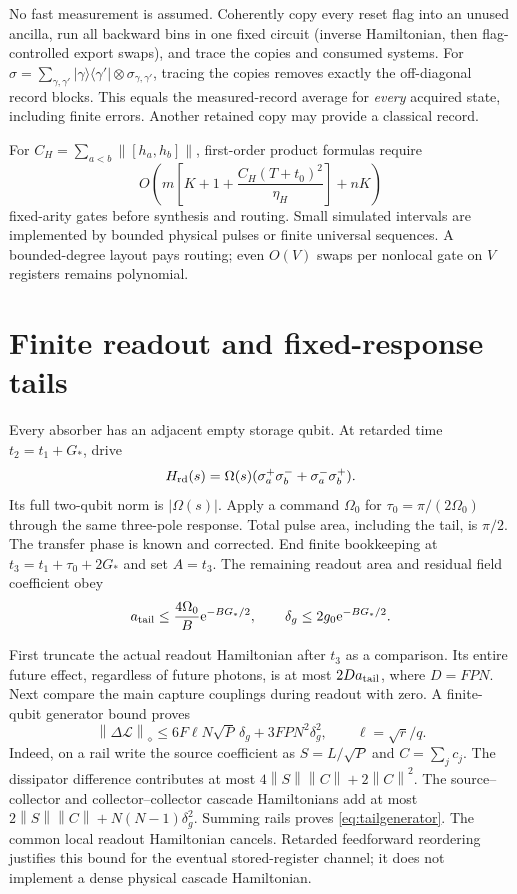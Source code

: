 \documentclass[11pt,a4paper]{article}
\newcommand{\norm}[1]{\left\lVert #1\right\rVert}\newcommand{\ket}[1]{\lvert #1\rangle}\newcommand{\bra}[1]{\langle #1\rvert}
\newcommand{\ee}{\mathrm e}
\begin{document}
No fast measurement is assumed. Coherently copy every reset flag into an unused ancilla, run all backward bins in one fixed circuit (inverse Hamiltonian, then flag-controlled export swaps), and trace the copies and consumed systems. For $\sigma=\sum_{\gamma,\gamma'}\ket\gamma\bra{\gamma'}\otimes\sigma_{\gamma,\gamma'}$, tracing the copies removes exactly the off-diagonal record blocks. This equals the measured-record average for \emph{every} acquired state, including finite errors. Another retained copy may provide a classical record.

For $C_H=\sum_{a<b}\norm{[h_a,h_b]}$, first-order product formulas require
\begin{equation}
 O\left(m\left[K+1+\frac{C_H(T+t_0)^2}{\eta_H}\right]+nK\right)
 \label{eq:decodercost}
\end{equation}
fixed-arity gates before synthesis and routing. Small simulated intervals are implemented by bounded physical pulses or finite universal sequences. A bounded-degree layout pays routing; even $O(V)$ swaps per nonlocal gate on $V$ registers remains polynomial.

\section{Finite readout and fixed-response tails}

Every absorber has an adjacent empty storage qubit. At retarded time $t_2=t_1+G_*$, drive
\begin{equation}
 H_{\rm rd}(s)=\Omega(s)(\sigma_a^+\sigma_b^-+\sigma_a^-\sigma_b^+).
\end{equation}
Its full two-qubit norm is $|\Omega(s)|$. Apply a command $\Omega_0$ for $\tau_0=\pi/(2\Omega_0)$ through the same three-pole response. Total pulse area, including the tail, is $\pi/2$. The transfer phase is known and corrected. End finite bookkeeping at $t_3=t_1+\tau_0+2G_*$ and set $A=t_3$. The remaining readout area and residual field coefficient obey
\begin{equation}
 a_{\rm tail}\le\frac{4\Omega_0}{B}\ee^{-BG_*/2},\qquad
 \delta_g\le2g_0\ee^{-BG_*/2}.
\end{equation}

First truncate the actual readout Hamiltonian after $t_3$ as a comparison. Its entire future effect, regardless of future photons, is at most $2D a_{\rm tail}$, where $D=FPN$. Next compare the main capture couplings during readout with zero. A finite-qubit generator bound proves
\begin{equation}
 \norm{\Delta\mathcal L}_\diamond
 \le6F\ell N\sqrt P\,\delta_g+3FPN^2\delta_g^2,
 \qquad\ell=\sqrt r/q.
 \label{eq:tailgenerator}
\end{equation}
Indeed, on a rail write the source coefficient as $S=L/\sqrt P$ and $C=\sum_jc_j$. The dissipator difference contributes at most $4\norm S\norm C+2\norm C^2$. The source--collector and collector--collector cascade Hamiltonians add at most $2\norm S\norm C+N(N-1)\delta_g^2$. Summing rails proves \eqref{eq:tailgenerator}. The common local readout Hamiltonian cancels. Retarded feedforward reordering justifies this bound for the eventual stored-register channel; it does not implement a dense physical cascade Hamiltonian.
\end{document}
